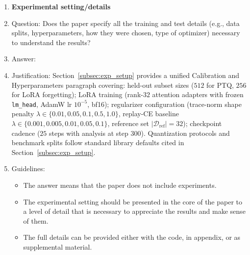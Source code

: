 \begin{enumerate}
\item {\bf Experimental setting/details}
    \item[] Question: Does the paper specify all the training and test details (e.g., data splits, hyperparameters, how they were chosen, type of optimizer) necessary to understand the results?
    \item[] Answer: \answerYes{}
    \item[] Justification: Section~\ref{subsec:exp_setup} provides a unified Calibration and Hyperparameters paragraph covering: held-out subset sizes ($512$ for PTQ, $256$ for LoRA forgetting); LoRA training (rank-$32$ attention adapters with frozen \texttt{lm\_head}, AdamW lr $10^{-5}$, bf16); regularizer configuration (trace-norm shape penalty $\lambda \in \{0.01, 0.05, 0.1, 0.5, 1.0\}$, replay-CE baseline $\lambda \in \{0.001, 0.005, 0.01, 0.05, 0.1\}$, reference set $|\mathcal{D}_{\mathrm{ref}}|=32$); checkpoint cadence ($25$ steps with analysis at step $300$). Quantization protocols and benchmark splits follow standard library defaults cited in Section~\ref{subsec:exp_setup}.
    \item[] Guidelines:
    \begin{itemize}
        \item The answer \answerNA{} means that the paper does not include experiments.
        \item The experimental setting should be presented in the core of the paper to a level of detail that is necessary to appreciate the results and make sense of them.
        \item The full details can be provided either with the code, in appendix, or as supplemental material.
    \end{itemize}


\end{enumerate}
